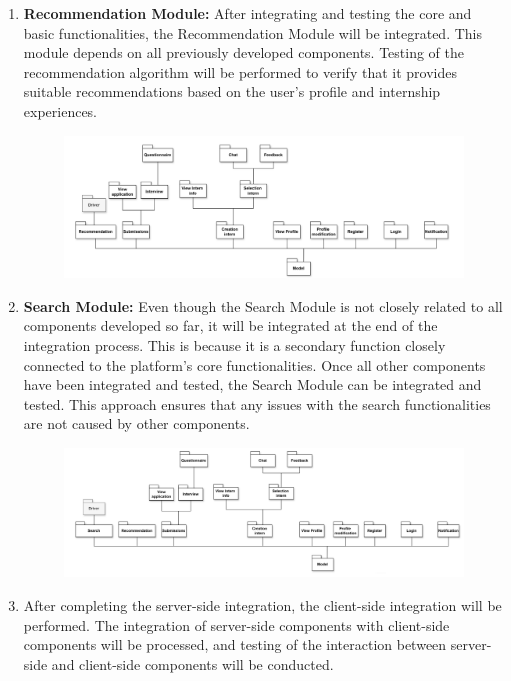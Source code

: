 \begin{enumerate}
\begin{figure}[H]
    \end{figure}
    \item \textbf{Recommendation Module:} After integrating and testing the core and basic functionalities, the Recommendation Module will be integrated. 
    This module depends on all previously developed components. Testing of the recommendation algorithm will be performed to verify that it provides 
    suitable recommendations based on the user's profile and internship experiences. 
    \begin{figure}[H]
        \centering
        \includegraphics[width=1\textwidth]{Images/BottomUp/Recomm.png}
    \end{figure}
    \item \textbf{Search Module:} Even though the Search Module is not closely related to all components developed so far, it will be integrated at the
     end of the integration process. This is because it is a secondary function closely connected to the platform's core functionalities. Once all other
      components have been integrated and tested, the Search Module can be integrated and tested. This approach ensures that any issues with the search 
      functionalities are not caused by other components.
      \begin{figure}[H]
        \centering
        \includegraphics[width=1\textwidth]{Images/BottomUp/Search.png}
    \end{figure}
    \item After completing the server-side integration, the client-side integration will be performed. The integration of server-side components with 
    client-side components will be processed, and testing of the interaction between server-side and client-side components will be conducted.
\end{enumerate}

